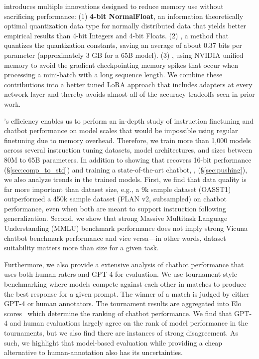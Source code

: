 \method introduces multiple innovations designed to reduce memory use without sacrificing performance: (1) \textbf{4-bit NormalFloat}, an information theoretically optimal quantization data type for normally distributed data that yields better empirical results than 4-bit Integers and 4-bit Floats. (2) \textbf{\Doublequant}, a method that quantizes the quantization constants, saving an average of about 0.37 bits per parameter (approximately 3 GB for a 65B model). (3) \textbf{\Pagedoptim}, using NVIDIA unified memory to avoid the gradient checkpointing memory spikes that occur when processing a mini-batch with a long sequence length. We combine these contributions into a better tuned LoRA approach that includes adapters at every network layer and thereby avoids almost all of the accuracy tradeoffs seen in prior work.

\method's efficiency enables us to perform an in-depth study of instruction finetuning and chatbot performance on model scales that would be impossible using regular finetuning due to memory overhead. Therefore, we train more than 1,000 models across several instruction tuning datasets, model architectures, and sizes between 80M to 65B parameters. In addition to showing that \method recovers 16-bit performance (\S\ref{sec:comp_to_std}) and training a state-of-the-art chatbot, \bfmodel, (\S\ref{sec:pushing}), we also analyze trends in the trained models. First, we find that data quality is far more important than dataset size, e.g., a 9k sample dataset (OASST1) outperformed a 450k sample dataset (FLAN v2, subsampled) on chatbot performance, even when both are meant to support instruction following generalization. Second, we show that strong Massive Multitask Language Understanding (MMLU) benchmark performance does not imply strong Vicuna chatbot benchmark performance and vice versa—in other words, dataset suitability matters more than size for a given task. 

Furthermore, we also provide a extensive analysis of chatbot performance that uses both human raters and GPT-4 for evaluation. We use tournament-style benchmarking where models compete against each other in matches to produce the best response for a given prompt. The winner of a match is judged by either GPT-4 or human annotators. The tournament results are aggregated into Elo scores~\citep{elo1967proposed, elo1978rating} which determine the ranking of chatbot performance. We find that GPT-4 and human evaluations largely agree on the rank of model performance in the tournaments, but we also find there are instances of strong disagreement. As such, we highlight that model-based evaluation while providing a cheap alternative to human-annotation also has its uncertainties. 

